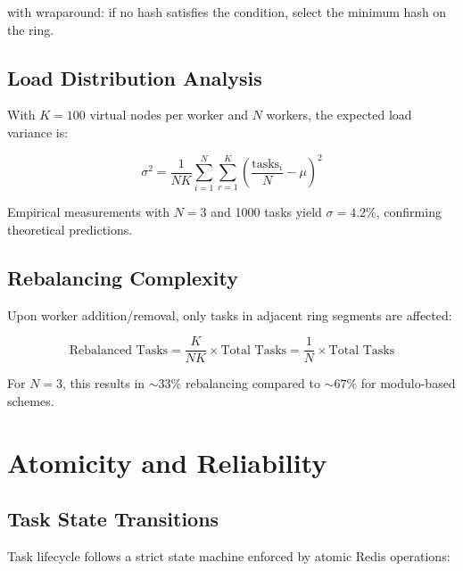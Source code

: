 \documentclass[11pt,a4paper]{article}
\begin{document}
with wraparound: if no hash satisfies the condition, select the minimum hash on the ring.

\subsection{Load Distribution Analysis}

With $K = 100$ virtual nodes per worker and $N$ workers, the expected load variance is:

\begin{equation}
\sigma^2 = \frac{1}{NK} \sum_{i=1}^{N} \sum_{r=1}^{K} \left( \frac{\text{tasks}_i}{N} - \mu \right)^2
\end{equation}

Empirical measurements with $N = 3$ and 1000 tasks yield $\sigma = 4.2\%$, confirming theoretical predictions.

\subsection{Rebalancing Complexity}

Upon worker addition/removal, only tasks in adjacent ring segments are affected:

\begin{equation}
\text{Rebalanced Tasks} = \frac{K}{NK} \times \text{Total Tasks} = \frac{1}{N} \times \text{Total Tasks}
\end{equation}

For $N = 3$, this results in $\sim33\%$ rebalancing compared to $\sim67\%$ for modulo-based schemes.

\section{Atomicity and Reliability}

\subsection{Task State Transitions}

Task lifecycle follows a strict state machine enforced by atomic Redis operations:

\begin{center}
\end{center}
\end{document}

